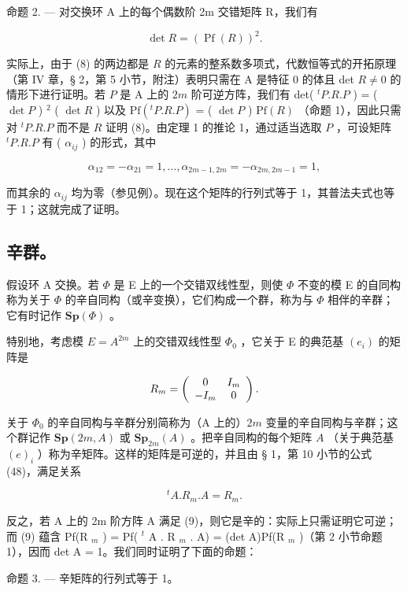 命题 2. --- 对交换环 A 上的每个偶数阶 2m 交错矩阵 R，我们有

\[
\det R = (\operatorname{Pf} (R)) ^ {2}.\tag{8}
\]

实际上，由于 (8) 的两边都是 \(R\) 的元素的整系数多项式，代数恒等式的开拓原理（第 IV 章，§ 2，第 5 小节，附注）表明只需在 A 是特征 0 的体且 det \(R \neq 0\) 的情形下进行证明。若 \(P\) 是 A 上的 \(2m\) 阶可逆方阵，我们有 det( \(^{t}P.R.P\) ) = ( \(\det P\) ) \(^{2}\) ( \(\det R\) ) 以及 \(\mathrm{Pf}(^{t}P.R.P)\) = ( \(\det P\) ) \(\mathrm{Pf}(R)\) （命题 1），因此只需对 \(^{t}P.R.P\) 而不是 \(R\) 证明 (8)。由定理 1 的推论 1，通过适当选取 \(P\) ，可设矩阵 \(^{t}P.R.P\) 有 ( \(\alpha_{ij}\) ) 的形式，其中

\[
\alpha_ {1 2} = - \alpha_ {2 1} = 1, \dots , \alpha_ {2 m - 1, 2 m} = - \alpha_ {2 m, 2 m - 1} = 1,
\]

而其余的 \(\alpha_{ij}\) 均为零（参见例）。现在这个矩阵的行列式等于 1，其普法夫式也等于 1；这就完成了证明。

\subsection{辛群。}

假设环 A 交换。若 \(\Phi\) 是 E 上的一个交错双线性型，则使 \(\Phi\) 不变的模 E 的自同构称为关于 \(\Phi\) 的辛自同构（或辛变换），它们构成一个群，称为与 \(\Phi\) 相伴的辛群；它有时记作 \(\mathbf{Sp}(\Phi)\) 。

特别地，考虑模 \(E = A^{2m}\) 上的交错双线性型 \(\Phi_{0}\) ，它关于 E 的典范基 \((e_{i})\) 的矩阵是

\[
R _ {m} = \left( \begin{array}{c c} 0 & I _ {m} \\ - I _ {m} & 0 \end{array} \right).
\]

关于 \(\Phi_{0}\) 的辛自同构与辛群分别简称为（A 上的）\(2m\) 变量的辛自同构与辛群；这个群记作 \(\mathbf{Sp}(2m, A)\) 或 \(\mathbf{Sp}_{2m}(A)\) 。把辛自同构的每个矩阵 \(A\) （关于典范基 \((e)_i\) ）称为辛矩阵。这样的矩阵是可逆的，并且由 § 1，第 10 小节的公式 (48)，满足关系

\[
{ } ^ { t } A . R _ { m } . A = R _ { m } .\tag{9}
\]

反之，若 A 上的 2m 阶方阵 A 满足 (9)，则它是辛的：实际上只需证明它可逆；而 (9) 蕴含 Pf(R \(_{m}\) ) = Pf( \(^{t}\) A . R \(_{m}\) . A) = (det A)Pf(R \(_{m}\) )（第 2 小节命题 1），因而 det A = 1。我们同时证明了下面的命题：

命题 3. --- 辛矩阵的行列式等于 1。

